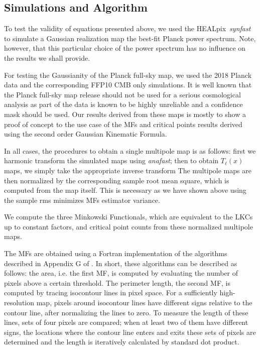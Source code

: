 \documentclass[aps,prd,showpacs,superscriptaddress,groupedaddress]{revtex4-1}  %
\newcommand{\healpix}{HEALpix~}
\begin{document}
\subsection*{Simulations and Algorithm}
To test the validity of equations presented above, we used the \healpix \emph{synfast} to simulate a Gaussian realization map the best-fit Planck power spectrum. Note, however, that this particular choice of the power spectrum has no influence on the results we shall provide.  

For testing the Gaussianity of the Planck full-sky map, we used the 2018 Planck data and the corresponding FFP10 CMB only simulations. It is well known that the Planck full-sky map release should not be used for a serious cosmological analysis as part of the data is known to be highly unreliable and a confidence mask should be used. Our results derived from these maps is mostly to show a proof of concept to the use case of the MFs and critical points results derived using the second order Gaussian Kinematic Formula.    

In all cases, the procedures to obtain a single multipole map is as follows: first we harmonic transform the simulated maps using \emph{anafast}; then to obtain $T_\ell(x)$ maps, we simply take the appropriate inverse transform 
The multipole maps are then normalized by the corresponding sample root mean square, which is computed from the map itself. This is necessary as we have shown above using the sample rms minimizes MFs estimator variance.

We compute  the three Minkowski Functionals, which are equivalent to the LKCs up to constant factors, and critical point counts from these normalized multipole maps.  

The MFs are obtained using a Fortran implementation of the algorithms described in
Appendix G of \cite{Gay2012_NGPeaks}. In short, these algorithms can be described
as follows: the area, i.e. the first MF, is computed by evaluating
the number of pixels above a certain threshold. The perimeter length, the
second MF, is computed by tracing isocontour lines in pixel space.
For a sufficiently high-resolution map, pixels around isocontour
lines have different signs relative to the contour line, after
normalizing the lines to zero. To measure the length of these
lines, sets of four pixels are compared; when at least two of them
have different signs, the locations where the contour line enters
and exits these sets of pixels are determined and the length is
iteratively calculated by standard dot product. 
\end{document}
